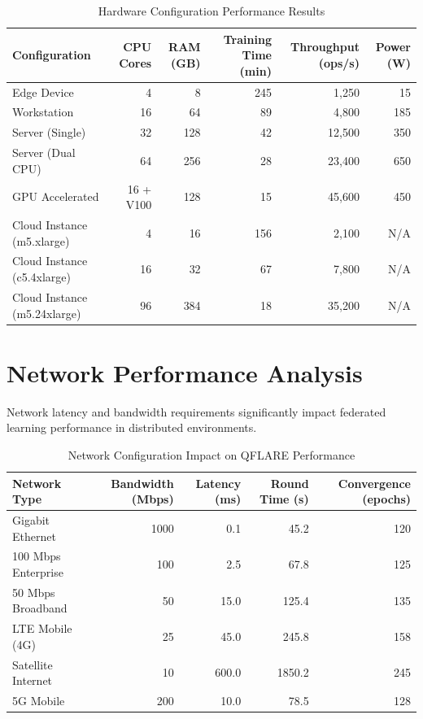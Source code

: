 \documentclass[12pt,a4paper,twoside]{book}
\begin{document}
\begin{table}[htbp]
\centering
\caption{Hardware Configuration Performance Results}
\label{tab:hardware-performance}
\begin{tabular}{@{}p{3cm}rrrrr@{}}
\toprule
\textbf{Configuration} & \textbf{CPU Cores} & \textbf{RAM (GB)} & \textbf{Training Time (min)} & \textbf{Throughput (ops/s)} & \textbf{Power (W)} \\
\midrule
Edge Device & 4 & 8 & 245 & 1,250 & 15 \\
Workstation & 16 & 64 & 89 & 4,800 & 185 \\
Server (Single) & 32 & 128 & 42 & 12,500 & 350 \\
Server (Dual CPU) & 64 & 256 & 28 & 23,400 & 650 \\
GPU Accelerated & 16 + V100 & 128 & 15 & 45,600 & 450 \\
Cloud Instance (m5.xlarge) & 4 & 16 & 156 & 2,100 & N/A \\
Cloud Instance (c5.4xlarge) & 16 & 32 & 67 & 7,800 & N/A \\
Cloud Instance (m5.24xlarge) & 96 & 384 & 18 & 35,200 & N/A \\
\bottomrule
\end{tabular}
\end{table}

\section{Network Performance Analysis}
\label{sec:network-performance}

Network latency and bandwidth requirements significantly impact federated learning performance in distributed environments.

\begin{table}[htbp]
\centering
\caption{Network Configuration Impact on QFLARE Performance}
\label{tab:network-performance}
\begin{tabular}{@{}lrrrr@{}}
\toprule
\textbf{Network Type} & \textbf{Bandwidth (Mbps)} & \textbf{Latency (ms)} & \textbf{Round Time (s)} & \textbf{Convergence (epochs)} \\
\midrule
Gigabit Ethernet & 1000 & 0.1 & 45.2 & 120 \\
100 Mbps Enterprise & 100 & 2.5 & 67.8 & 125 \\
50 Mbps Broadband & 50 & 15.0 & 125.4 & 135 \\
LTE Mobile (4G) & 25 & 45.0 & 245.8 & 158 \\
Satellite Internet & 10 & 600.0 & 1850.2 & 245 \\
5G Mobile & 200 & 10.0 & 78.5 & 128 \\
\bottomrule
\end{tabular}
\end{table}
\end{document}
